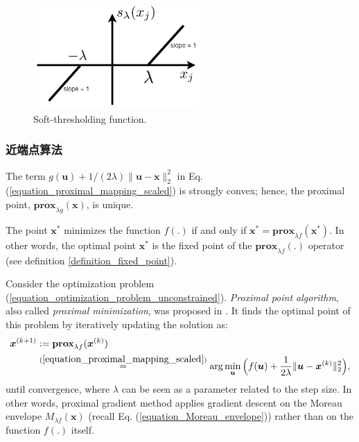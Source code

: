 \documentclass[lang=cn,10pt]{gorgeousnbook}
\numberwithin{equation}{section}%
\numberwithin{figure}{section}%
\begin{document}
\begin{figure}[!t]
\centering
\includegraphics[width=2.5in]{./images/soft_thresholding}
\caption{Soft-thresholding function.}
\label{figure_soft_thresholding}
\end{figure}

\subsubsection{近端点算法}

The term $g(\boldsymbol{u}) + 1 / (2\lambda) \|\boldsymbol{u} - \boldsymbol{x}\|_2^2$ in Eq. (\ref{equation_proximal_mapping_scaled}) is strongly convex; hence, the proximal point, $\textbf{prox}_{\lambda g}(\boldsymbol{x})$, is unique. 

\begin{lemma}
The point $\boldsymbol{x}^*$ minimizes the function $f(.)$ if and only if $\boldsymbol{x}^* = \textbf{prox}_{\lambda f}(\boldsymbol{x}^*)$.
In other words, the optimal point $\boldsymbol{x}^*$ is the fixed point of the $\textbf{prox}_{\lambda f}(.)$ operator (see definition \ref{definition_fixed_point}). 
\end{lemma}

Consider the optimization problem (\ref{equation_optimization_problem_unconstrained}). 
\textit{Proximal point algorithm}, also called \textit{proximal minimization}, was proposed in \cite{rockafellar1976monotone}. It finds the optimal point of this problem by iteratively updating the solution as:
\begin{align}
\boldsymbol{x}^{(k+1)} &:= \textbf{prox}_{\lambda f}(\boldsymbol{x}^{(k)}) \nonumber\\
&\overset{(\ref{equation_proximal_mapping_scaled})}{=} \arg\min_{\boldsymbol{u}} \Big( f(\boldsymbol{u}) + \frac{1}{2\lambda} \|\boldsymbol{u} - \boldsymbol{x}^{(k)}\|_2^2 \Big),
\end{align}
until convergence, where $\lambda$ can be seen as a parameter related to the step size. 
In other words, proximal gradient method applies gradient descent on the Moreau envelope $M_{\lambda f}(\boldsymbol{x})$ (recall Eq. (\ref{equation_Moreau_envelope})) rather than on the function $f(.)$ itself.
\end{document}
